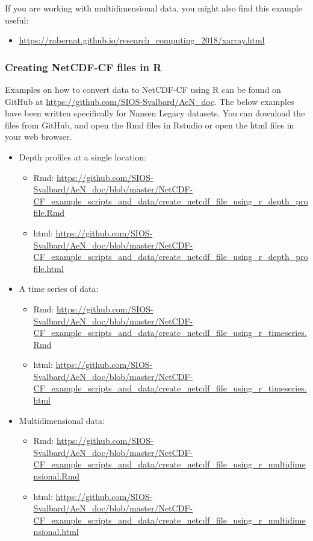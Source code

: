 \documentclass[a4paper,english, 11pt]{article}
\begin{document}
If you are working with multidimensional data, you might also find this example useful:
\begin{itemize}
\item \url{https://rabernat.github.io/research_computing_2018/xarray.html}
\end{itemize}

\subsubsection{Creating NetCDF-CF files in R}
\label{ss:R}

Examples on how to convert data to NetCDF-CF using R can be found on GitHub at \href{https://github.com/SIOS-Svalbard/AeN_doc}{https://github.com/SIOS-Svalbard/AeN\_doc}. The below examples have been written specifically for Nansen Legacy datasets. You can download the files from GitHub, and open the Rmd files in Rstudio or open the html files in your web browser.

\begin{itemize}

\item Depth profiles at a single location:
\begin{itemize}
\item Rmd: \url{https://github.com/SIOS-Svalbard/AeN_doc/blob/master/NetCDF-CF_example_scripts_and_data/create_netcdf_file_using_r_depth_profile.Rmd}
\item html: \url{https://github.com/SIOS-Svalbard/AeN_doc/blob/master/NetCDF-CF_example_scripts_and_data/create_netcdf_file_using_r_depth_profile.html}
\end{itemize}

\item A time series of data: 
\begin{itemize}
\item Rmd: \url{https://github.com/SIOS-Svalbard/AeN_doc/blob/master/NetCDF-CF_example_scripts_and_data/create_netcdf_file_using_r_timeseries.Rmd}
\item html: \url{https://github.com/SIOS-Svalbard/AeN_doc/blob/master/NetCDF-CF_example_scripts_and_data/create_netcdf_file_using_r_timeseries.html}
\end{itemize}

\item Multidimensional data:
\begin{itemize}
\item Rmd: \url{https://github.com/SIOS-Svalbard/AeN_doc/blob/master/NetCDF-CF_example_scripts_and_data/create_netcdf_file_using_r_multidimensional.Rmd}
\item html: \url{https://github.com/SIOS-Svalbard/AeN_doc/blob/master/NetCDF-CF_example_scripts_and_data/create_netcdf_file_using_r_multidimensional.html}
\end{itemize}

\end{itemize}
\end{document}
